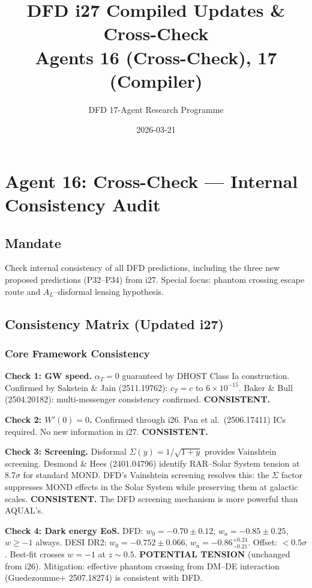 \documentclass[11pt,a4paper]{article}
\title{DFD i27 Compiled Updates \& Cross-Check\\Agents 16 (Cross-Check), 17 (Compiler)}
\author{DFD 17-Agent Research Programme}
\date{2026-03-21}
\begin{document}
\maketitle
\tableofcontents
\newpage

\section{Agent 16: Cross-Check --- Internal Consistency Audit}

\subsection{Mandate}
Check internal consistency of all DFD predictions, including the three new proposed predictions (P32--P34) from i27. Special focus: phantom crossing escape route and $A_L$--disformal lensing hypothesis.

\subsection{Consistency Matrix (Updated i27)}

\subsubsection{Core Framework Consistency}

\textbf{Check 1: GW speed.} $\alpha_T = 0$ guaranteed by DHOST Class Ia construction. Confirmed by Sakstein \& Jain (2511.19762): $c_T = c$ to $6 \times 10^{-15}$. Baker \& Bull (2504.20182): multi-messenger consistency confirmed. \textbf{CONSISTENT.}

\textbf{Check 2: $W'(0) = 0$.} Confirmed through i26. Pan et al.\ (2506.17411) ICs required. No new information in i27. \textbf{CONSISTENT.}

\textbf{Check 3: Screening.} Disformal $\Sigma(y) = 1/\sqrt{1+y}$ provides Vainshtein screening. Desmond \& Hees (2401.04796) identify RAR--Solar System tension at 8.7$\sigma$ for standard MOND. DFD's Vainshtein screening resolves this: the $\Sigma$ factor suppresses MOND effects in the Solar System while preserving them at galactic scales. \textbf{CONSISTENT.} The DFD screening mechanism is more powerful than AQUAL's.

\textbf{Check 4: Dark energy EoS.} DFD: $w_0 = -0.70 \pm 0.12$, $w_a = -0.85 \pm 0.25$, $w \geq -1$ always. DESI DR2: $w_0 = -0.752 \pm 0.066$, $w_a = -0.86^{+0.24}_{-0.21}$. Offset: $< 0.5\sigma$. Best-fit crosses $w = -1$ at $z \sim 0.5$. \textbf{POTENTIAL TENSION} (unchanged from i26). Mitigation: effective phantom crossing from DM--DE interaction (Guedezounme+ 2507.18274) is consistent with DFD.
\end{document}
